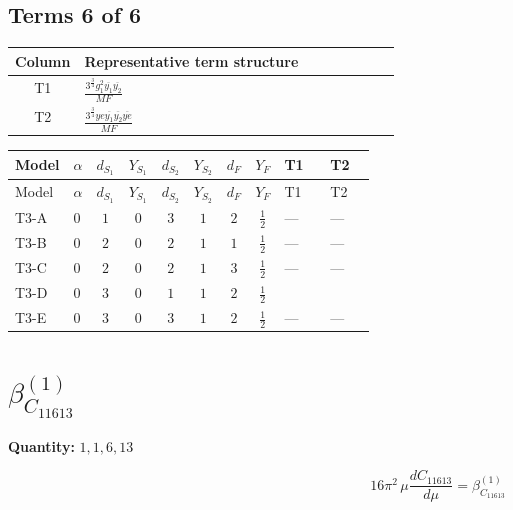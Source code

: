 \documentclass[8pt]{article}
\begin{document}
\begin{landscape}
\subsection*{Terms 6 of 6}
\begin{center}
\begin{tabular}{@{}c >{\raggedright\arraybackslash}p{0.82\linewidth}@{}}
\toprule
Column & Representative term structure \\
\midrule
T1 & \(\displaystyle \frac{3^{\frac{3}{4}} g_{1}^{2} \overline{y_{1}} \overline{y_{2}}}{MF}\) \\
\midrule
T2 & \(\displaystyle \frac{3^{\frac{3}{4}} ye \overline{y_{1}} \overline{y_{2}} \overline{ye}}{MF}\) \\
\midrule
\bottomrule
\end{tabular}
\end{center}
\smallskip
\tiny
\begin{longtable}{@{}llcccccc >{\raggedright\arraybackslash}p{0.21\linewidth} >{\raggedright\arraybackslash}p{0.21\linewidth}@{}}
\toprule
Model & $\alpha$ & $d_{S_1}$ & $Y_{S_1}$ & $d_{S_2}$ & $Y_{S_2}$ & $d_F$ & $Y_F$ & T1 & T2 \\
\midrule
\endfirsthead
\toprule
Model & $\alpha$ & $d_{S_1}$ & $Y_{S_1}$ & $d_{S_2}$ & $Y_{S_2}$ & $d_F$ & $Y_F$ & T1 & T2 \\
\midrule
\endhead
T3-A & $0$ & $1$ & $0$ & $3$ & $1$ & $2$ & $\frac{1}{2}$ & --- & --- \\
\midrule
T3-B & $0$ & $2$ & $0$ & $2$ & $1$ & $1$ & $\frac{1}{2}$ & --- & --- \\
\midrule
T3-C & $0$ & $2$ & $0$ & $2$ & $1$ & $3$ & $\frac{1}{2}$ & --- & --- \\
\midrule
T3-D & $0$ & $3$ & $0$ & $1$ & $1$ & $2$ & $\frac{1}{2}$ & \scriptsize\adjustbox{max width=\linewidth}{$\begin{gathered} - \frac{3^{\frac{3}{4}} g_{1}^{2} \overline{y_{1}} \overline{y_{2}}}{8 MF}\end{gathered}$} & \scriptsize\adjustbox{max width=\linewidth}{$\begin{gathered} \frac{3^{\frac{3}{4}} ye \overline{y_{1}} \overline{y_{2}} \overline{ye}}{12 MF}\end{gathered}$} \\
\midrule
T3-E & $0$ & $3$ & $0$ & $3$ & $1$ & $2$ & $\frac{1}{2}$ & --- & --- \\
\midrule
\bottomrule
\end{longtable}
\clearpage
\section*{$\beta_{C_{11613}}^{(1)}$}
\noindent\textbf{Quantity: }$\mathrm{1,1,6,13}$\par\smallskip
\[16\pi^2\,\mu\frac{d C_{11613}}{d\mu}=\beta_{C_{11613}}^{(1)}\]

\end{landscape}
\end{document}
